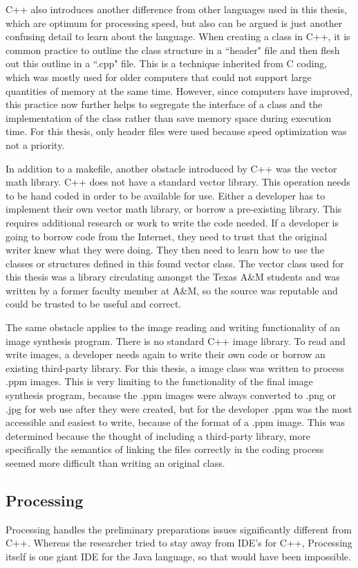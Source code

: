 C++ also introduces another difference from other languages used in this thesis, which are optimum for processing speed, but also can be argued is just another confusing detail to learn about the language.  When creating a class in C++, it is common practice to outline the class structure in a ``header" file and then flesh out this outline in a ``.cpp" file.  This is a technique inherited from C coding, which was mostly used for older computers that could not support large quantities of memory at the same time.  However, since computers have improved, this practice now further helps to segregate the interface of a class and the implementation of the class rather than save memory space during execution time.  For this thesis, only header files were used because speed optimization was not a priority.

In addition to a makefile, another obstacle introduced by C++ was the vector math library.  C++ does not have a standard vector library.  This operation needs to be hand coded in order to be available for use.  Either a developer has to implement their own vector math library, or borrow a pre-existing library.  This requires additional research or work to write the code needed.  If a developer is going to borrow code from the Internet, they need to trust that the original writer knew what they were doing.  They then need to learn how to use the classes or structures defined in this found vector class.  The vector class used for this thesis was a library circulating amongst the Texas A\&M students and was written by a former faculty member at A\&M, so the source was reputable and could be trusted to be useful and correct.

The same obstacle applies to the image reading and writing functionality of an image synthesis program.  There is no standard C++ image library.  To read and write images, a developer needs again to write their own code or borrow an existing third-party library.  For this thesis, a image class was written to process .ppm images.  This is very limiting to the functionality of the final image synthesis program, because the .ppm images were always converted to .png or .jpg for web use after they were created, but for the developer .ppm was the most accessible and easiest to write, because of the format of a .ppm image.  This was determined because the thought of including a third-party library, more specifically the semantics of linking the files correctly in the coding process seemed more difficult than writing an original class.
\subsection{Processing}
Processing handles the preliminary preparations issues significantly different from C++.  Whereas the researcher tried to stay away from IDE's for C++, Processing itself is one giant IDE for the Java language, so that would have been impossible.

